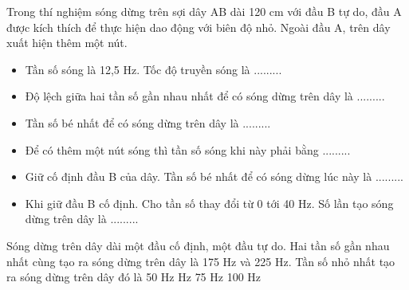 \begin{vidu}%
Trong thí nghiệm sóng dừng trên sợi dây AB dài 120 cm với đầu B tự do, đầu A được kích thích để thực hiện dao động với biên độ nhỏ. Ngoài đầu A, trên dây xuất hiện thêm một nút. 
\begin{itemize}
\item [1.] Tần số sóng là 12,5 Hz. Tốc độ truyền sóng  là ......... 
\item [2.] Độ lệch giữa hai tần số gần nhau nhất để có sóng dừng trên dây  là ......... 
\item [3.] Tần số bé nhất để có sóng dừng trên dây là ......... 
\item [4.] Để có thêm một nút sóng thì tần số sóng khi này phải bằng  ......... 
\item [5.] Giữ cố định đầu B của dây. Tần số bé nhất để có sóng dừng lúc này là ......... 
\item [6.] Khi giữ đầu B cố định. Cho tần số thay đổi từ 0 tới 40 Hz. Số lần tạo sóng dừng trên dây  là ......... 
\end{itemize}
\end{vidu} 
\begin{vidu}%
Sóng dừng trên dây dài một đầu cố định, một đầu tự do. Hai tần số gần nhau nhất cùng tạo ra sóng dừng trên dây là 175 Hz và 225 Hz. Tần số nhỏ nhất tạo ra sóng dừng trên dây đó là
\choice
{50 Hz}
{ Hz}
{75 Hz}
{100 Hz}
\end{vidu} 
